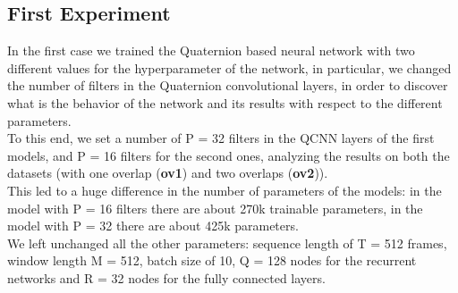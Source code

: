 \documentclass{article}
\begin{document}
    \subsection*{First Experiment}
    In the first case we trained the Quaternion based neural network with two different values for the hyperparameter of the network, 
    in particular, we changed the number of filters in the Quaternion convolutional layers, in order to discover what is the behavior 
    of the network and its results with respect to the different parameters.\\
    To this end, we set a number of P = 32 filters in the QCNN layers of the first models, and P = 16 filters for the second ones, 
    analyzing the results on both the datasets (with one overlap (\textbf{ov1}) and two overlaps (\textbf{ov2})).\\
    This led to a huge difference in the number of parameters of the models: in the model with P = 16 filters there are about 270k 
    trainable parameters, in the model with P = 32 there are about 425k parameters.\\
    We left unchanged all the other parameters: sequence length of T = 512 frames, window length M = 512, batch size of 10, Q = 128 
    nodes for the recurrent networks and R = 32 nodes for the fully connected layers.
\end{document}
